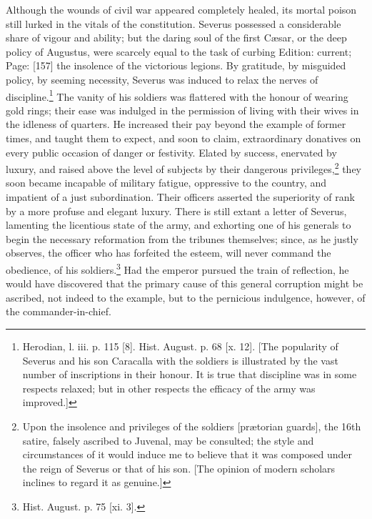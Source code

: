 Although the wounds of civil war appeared completely healed, its mortal poison still lurked in the vitals of the constitution. Severus possessed a considerable share of vigour and ability; but the daring soul of the first Cæsar, or the deep policy of Augustus, were scarcely equal to the task of curbing Edition: current; Page: [157] the insolence of the victorious legions. By gratitude, by misguided policy, by seeming necessity, Severus was induced to relax the nerves of discipline.\footnote{Herodian, l. iii. p. 115 [8]. Hist. August. p. 68 [x. 12]. [The popularity of Severus and his son Caracalla with the soldiers is illustrated by the vast number of inscriptions in their honour. It is true that discipline was in some respects relaxed; but in other respects the efficacy of the army was improved.]} The vanity of his soldiers was flattered with the honour of wearing gold rings; their ease was indulged in the permission of living with their wives in the idleness of quarters. He increased their pay beyond the example of former times, and taught them to expect, and soon to claim, extraordinary donatives on every public occasion of danger or festivity. Elated by success, enervated by luxury, and raised above the level of subjects by their dangerous privileges,\footnote{Upon the insolence and privileges of the soldiers [prætorian guards], the 16th satire, falsely ascribed to Juvenal, may be consulted; the style and circumstances of it would induce me to believe that it was composed under the reign of Severus or that of his son. [The opinion of modern scholars inclines to regard it as genuine.]} they soon became incapable of military fatigue, oppressive to the country, and impatient of a just subordination. Their officers asserted the superiority of rank by a more profuse and elegant luxury. There is still extant a letter of Severus, lamenting the licentious state of the army, and exhorting one of his generals to begin the necessary reformation from the tribunes themselves; since, as he justly observes, the officer who has forfeited the esteem, will never command the obedience, of his soldiers.\footnote{Hist. August. p. 75 [xi. 3].} Had the emperor pursued the train of reflection, he would have discovered that the primary cause of this general corruption might be ascribed, not indeed to the example, but to the pernicious indulgence, however, of the commander-in-chief.

